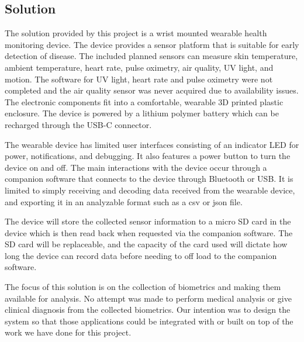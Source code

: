 \subsection{Solution}

The solution provided by this project is a wrist mounted wearable health 
monitoring device. The device provides a sensor platform that is suitable for 
early detection of disease. The included planned sensors can measure skin temperature, 
ambient temperature, heart rate, pulse oximetry, air quality, UV light, and motion.  
The software for UV light, heart rate and pulse oximetry were not completed and
the air quality sensor was never acquired due to availability issues. The electronic
components fit into a comfortable, wearable 3D printed plastic enclosure.
The device is powered by a lithium polymer battery which can be recharged
through the USB-C connector.

The wearable device has limited user interfaces consisting of an indicator
LED for power, notifications, and debugging. It also features a power button
to turn the device on and off. The main interactions with the device occur 
through a companion software that connects to the device through Bluetooth or 
USB. It is limited to simply receiving and decoding data received from the 
wearable device, and exporting it in an analyzable format such as a csv or json 
file.

The device will store the collected sensor information to a micro SD card
in the device which is then read back when requested via the companion software.
The SD card will be replaceable, and the capacity of the card used will dictate
how long the device can record data before needing to off load to the companion
software.

The focus of this solution is on the collection of biometrics and making them
available for analysis. No attempt was made to perform medical analysis
or give clinical diagnosis from the collected biometrics. Our intention was to
design the system so that those applications could be integrated with or built
on top of the work we have done for this project.



